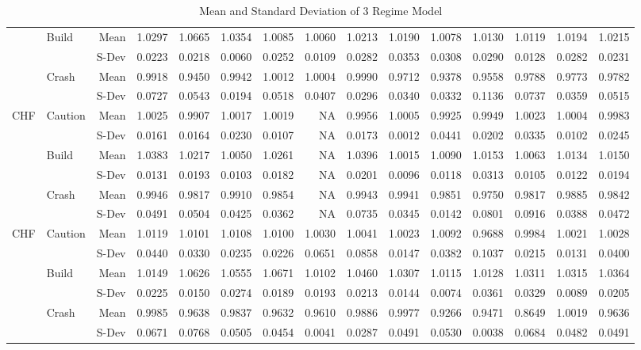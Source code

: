 \documentclass[12pt, a4paper, oneside]{article} %
\begin{document}
\begin{landscape}
\begin{table}[ht]
\begin{tabular}{llrrrrrrrrrrrrr}
  & \multirow{2}{*}{Build} & Mean & 1.0297 & 1.0665 & 1.0354 & 1.0085 & 1.0060 & 1.0213 & 1.0190 & 1.0078 & 1.0130 & 1.0119 & 1.0194 & 1.0215\\ 
  && S-Dev & 0.0223 & 0.0218 & 0.0060 & 0.0252 & 0.0109 & 0.0282 & 0.0353 & 0.0308 & 0.0290 & 0.0128 & 0.0282 & 0.0231 \\ 
  & \multirow{2}{*}{Crash} & Mean & 0.9918 & 0.9450 & 0.9942 & 1.0012 & 1.0004 & 0.9990 & 0.9712 & 0.9378 & 0.9558 & 0.9788 & 0.9773 & 0.9782\\ 
  && S-Dev & 0.0727 & 0.0543 & 0.0194 & 0.0518 & 0.0407 & 0.0296 & 0.0340 & 0.0332 & 0.1136 & 0.0737 & 0.0359 & 0.0515\\ 
\hline
\multirow{6}{*}{CHF}& \multirow{2}{*}{Caution} & Mean& 1.0025 & 0.9907 & 1.0017 & 1.0019 & NA & 0.9956 & 1.0005 & 0.9925 & 0.9949 & 1.0023 & 1.0004 & 0.9983\\ 
  && S-Dev & 0.0161 & 0.0164 & 0.0230 & 0.0107 & NA & 0.0173 & 0.0012 & 0.0441 & 0.0202 & 0.0335 & 0.0102 & 0.0245\\ 
  & \multirow{2}{*}{Build} &  Mean & 1.0383 & 1.0217 & 1.0050 & 1.0261 & NA & 1.0396 & 1.0015 & 1.0090 & 1.0153 & 1.0063 & 1.0134 & 1.0150\\ 
  && S-Dev & 0.0131 & 0.0193 & 0.0103 & 0.0182 & NA & 0.0201 & 0.0096 & 0.0118 & 0.0313 & 0.0105 & 0.0122 & 0.0194\\ 
  & \multirow{2}{*}{Crash} & Mean & 0.9946 & 0.9817 & 0.9910 & 0.9854 & NA & 0.9943 & 0.9941 & 0.9851 & 0.9750 & 0.9817 & 0.9885 & 0.9842 \\ 
  &&S-Dev & 0.0491 & 0.0504 & 0.0425 & 0.0362 & NA & 0.0735 & 0.0345 & 0.0142 & 0.0801 & 0.0916 & 0.0388 & 0.0472\\ 
\hline
\multirow{6}{*}{CHF}& \multirow{2}{*}{Caution} & Mean & 1.0119 & 1.0101 & 1.0108 & 1.0100 & 1.0030 & 1.0041 & 1.0023 & 1.0092 & 0.9688 & 0.9984 & 1.0021 & 1.0028\\ 
  && S-Dev& 0.0440 & 0.0330 & 0.0235 & 0.0226 & 0.0651 & 0.0858 & 0.0147 & 0.0382 & 0.1037 & 0.0215 & 0.0131 & 0.0400\\ 
  & \multirow{2}{*}{Build} & Mean & 1.0149 & 1.0626 & 1.0555 & 1.0671 & 1.0102 & 1.0460 & 1.0307 & 1.0115 & 1.0128 & 1.0311 & 1.0315 & 1.0364\\ 
  && S-Dev & 0.0225 & 0.0150 & 0.0274 & 0.0189 & 0.0193 & 0.0213 & 0.0144 & 0.0074 & 0.0361 & 0.0329 & 0.0089 & 0.0205\\ 
  & \multirow{2}{*}{Crash} & Mean & 0.9985 & 0.9638 & 0.9837 & 0.9632 & 0.9610 & 0.9886 & 0.9977 & 0.9266 & 0.9471 & 0.8649 & 1.0019 & 0.9636 \\ 
  && S-Dev& 0.0671 & 0.0768 & 0.0505 & 0.0454 & 0.0041 & 0.0287 & 0.0491 & 0.0530 & 0.0038 & 0.0684 & 0.0482 & 0.0491\\ 
   \hline
\end{tabular}
\caption{Mean and Standard Deviation of 3 Regime Model}
\label{tabref:3StateProb}
\end{table}
\end{landscape}
\end{document}
